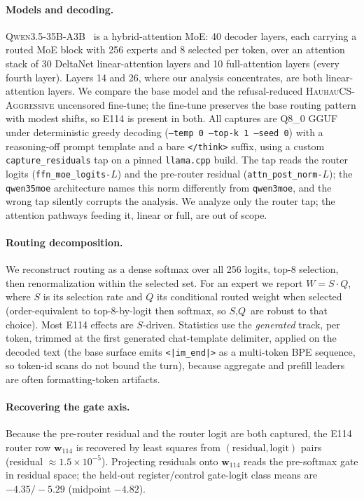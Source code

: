 \documentclass[10pt,a4paper,twocolumn]{article}
\newcommand{\W}{\textit{W}}
\newcommand{\Sel}{\textit{S}}
\newcommand{\Q}{\textit{Q}}
\newcommand{\wvec}{\mathbf{w}_{114}}
\begin{document}
\paragraph{Models and decoding.}
\textsc{Qwen3.5-35B-A3B}~\cite{model} is a hybrid-attention MoE: 40 decoder layers, each
carrying a routed MoE block with 256 experts and 8 selected per token, over an
attention stack of 30 DeltaNet linear-attention layers and 10 full-attention
layers (every fourth layer). Layers 14 and 26, where our analysis concentrates,
are both linear-attention layers. We compare the base model and the refusal-reduced
\textsc{HauhauCS-Aggressive} uncensored fine-tune; the fine-tune preserves the
base routing pattern with modest shifts, so E114 is present in both. All captures
are Q8\_0 GGUF under deterministic greedy decoding (\texttt{--temp 0 --top-k 1
--seed 0}) with a reasoning-off prompt template and a bare
\texttt{</think>} suffix, using a custom \texttt{capture\_residuals} tap on a
pinned \texttt{llama.cpp} build. The tap reads the router logits
(\texttt{ffn\_moe\_logits-}$L$) and the pre-router residual
(\texttt{attn\_post\_norm-}$L$); the \texttt{qwen35moe} architecture names this
norm differently from \texttt{qwen3moe}, and the wrong tap silently corrupts the
analysis. We analyze only the router tap; the attention pathways feeding it, linear or
full, are out of scope.

\paragraph{Routing decomposition.}
We reconstruct routing as a dense softmax over all 256 logits, top-8 selection,
then renormalization within the selected set. For an expert we report
$\W{=}\Sel\!\cdot\!\Q$, where $\Sel$ is its selection rate and $\Q$ its
conditional routed weight when selected (order-equivalent to top-8-by-logit then
softmax, so $\Sel,\Q$ are robust to that choice). Most E114 effects are
$\Sel$-driven. Statistics use the \emph{generated} track, per token, trimmed at the first generated chat-template delimiter, applied on the decoded
text (the base surface emits \texttt{<|im\_end|>} as a multi-token BPE
sequence, so token-id scans do not bound the turn), because aggregate and
prefill leaders are often formatting-token artifacts.

\paragraph{Recovering the gate axis.}
Because the pre-router residual and the router logit are both captured, the E114
router row $\wvec$ is recovered by least squares from $(\text{residual},
\text{logit})$ pairs (residual $\approx 1.5\times10^{-5}$). Projecting residuals
onto $\wvec$ reads the pre-softmax gate in residual space; the held-out
register/control gate-logit class means are $-4.35/-5.29$ (midpoint $-4.82$).
\end{document}
